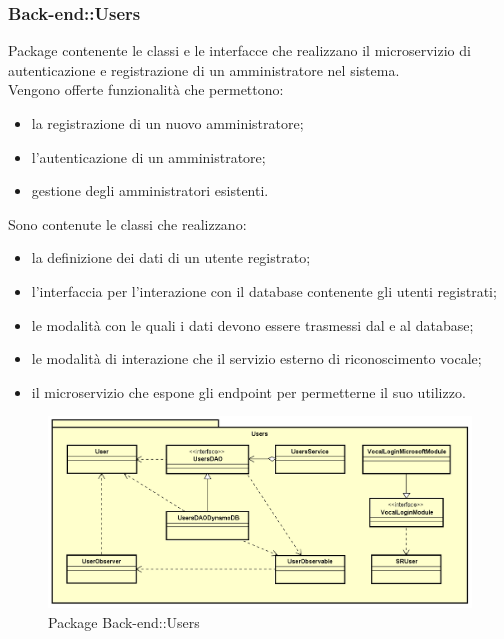 \subsubsection{Back-end::Users}
Package contenente le classi e le interfacce che realizzano il microservizio di autenticazione e registrazione di un amministratore nel sistema.\\
Vengono offerte funzionalità che permettono:
\begin{itemize}
\item la registrazione di un nuovo amministratore;
\item l'autenticazione di un amministratore;
\item gestione degli amministratori esistenti.
\end{itemize}
Sono contenute le classi che realizzano:
 \begin{itemize}
 \item la definizione dei dati di un utente registrato;
 \item l'interfaccia per l'interazione con il database contenente gli utenti registrati;
 \item le modalità con le quali i dati devono essere trasmessi dal e al database;
 \item le modalità di interazione che il servizio esterno di riconoscimento vocale;
 \item il microservizio che espone gli endpoint per permetterne il suo utilizzo.
\end{itemize}
\begin{figure}[h] \centering \includegraphics[width=\textwidth,height=\textheight,keepaspectratio]{images/diagrams/back-end/Official_Backend_0304/Users.png}
	\caption{Package Back-end::Users}
\end{figure}

